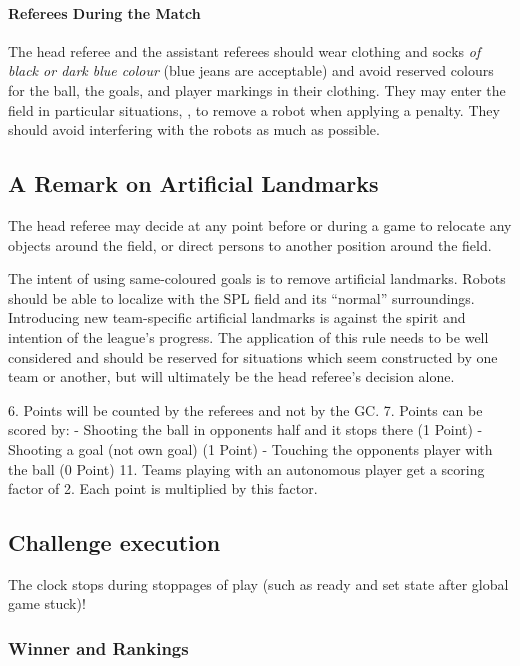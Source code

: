\paragraph{Referees During the Match}

The head referee and the assistant referees should wear clothing and socks \emph{of black or dark blue colour} (blue jeans are acceptable) and avoid reserved colours for the ball, the goals, and player markings in their clothing. They may enter the field in particular situations, \eg, to remove a robot when applying a penalty. They should avoid interfering with the robots as much as possible.

\subsection{A Remark on Artificial Landmarks}
\label{sec:judgment:landmarks}

The head referee may decide at any point before or during a game to relocate any objects around the field, or direct persons to another position around the field.

The intent of using same-coloured goals is to remove artificial landmarks.
Robots should be able to localize with the SPL field and its ``normal'' surroundings.
Introducing new team-specific artificial landmarks is against the spirit and intention of the league's progress.
The application of this rule needs to be well considered and should be reserved for situations which seem constructed by one team or another, but will ultimately be the head referee's decision alone.

\newpage

6. Points will be counted by the referees and not by the GC.
7. Points can be scored by:
    - Shooting the ball in opponents half and it stops there (1 Point)
    - Shooting a goal (not own goal) (1 Point)
    - Touching the opponents player with the ball (0 Point)
11. Teams playing with an autonomous player get a scoring factor of 2. Each point is multiplied by this factor.

\subsection{Challenge execution}
The clock stops during stoppages of play (such as ready and set state after global game stuck)!

\subsubsection{Winner and Rankings}
\label{sec:rankings}

